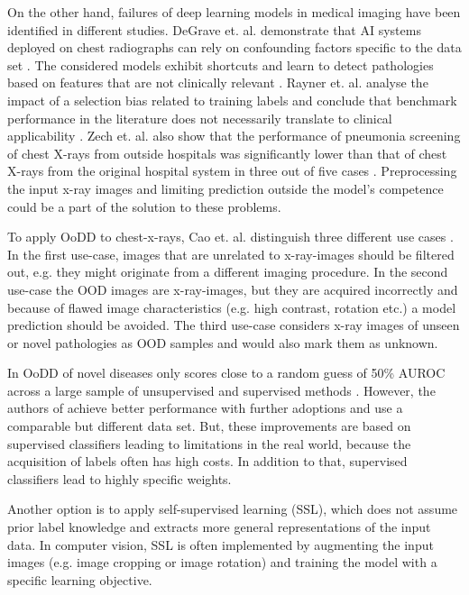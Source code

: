 On the other hand, failures of deep learning models in medical imaging have been identified in different studies.
DeGrave et. al. demonstrate that AI systems deployed on chest radiographs can rely on confounding factors specific to the data set \citep{Degrave2021}.
The considered models exhibit shortcuts and learn to detect pathologies based on features that are not clinically relevant \citep{Degrave2021}.
Rayner et. al. analyse the impact of a selection bias related to training labels and conclude that benchmark performance in the literature does not necessarily translate to clinical applicability \citep{Rayner2019}.
Zech et. al. also show that the performance of pneumonia screening of chest X-rays from outside hospitals was significantly lower than that of chest X-rays from the original hospital system in three out of five cases \citep{Zech2018}.
Preprocessing the input x-ray images and limiting prediction outside the model's competence could be a part of the solution to these problems.
\par
To apply OoDD to chest-x-rays, Cao et. al. distinguish three different use cases \citep{Cao2020}.
In the first use-case, images that are unrelated to x-ray-images should be filtered out, e.g. they might originate from a different imaging procedure.
In the second use-case the OOD images are x-ray-images, but they are acquired incorrectly and because of flawed image characteristics (e.g. high contrast, rotation etc.) a model prediction should be avoided.
The third use-case considers x-ray images of unseen or novel pathologies as OOD samples and would also mark them as unknown.
\par
In \citep{Cao2020} OoDD of novel diseases only scores close to a random guess of 50\% AUROC across a large sample of unsupervised and supervised methods \citep{Cao2020}.
However, the authors of \citep{Berger2021} achieve better performance with further adoptions and use a comparable but different data set.
But, these improvements are based on supervised classifiers leading to limitations in the real world, because the acquisition of labels often has high costs. 
In addition to that, supervised classifiers lead to highly specific weights.
\par
Another option is to apply self-supervised learning (SSL), which does not assume prior label knowledge and extracts more general representations of the input data.
In computer vision, SSL is often implemented by augmenting the input images (e.g. image cropping or image rotation) and training the model with a specific learning objective.
